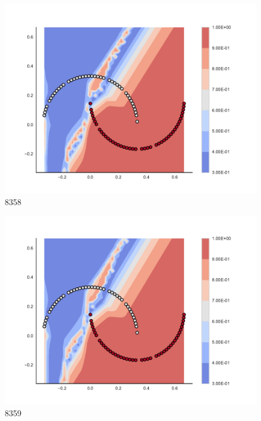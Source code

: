 \begin{subfigure}[b]{0.09\textwidth}
    \includegraphics[clip, trim=2.35cm 1.75cm 4.5cm 0cm,width=\textwidth]{img/convergence/8358.pdf}
    \caption{8358}
    \label{fig:convergence_8358}
\end{subfigure}
%
\begin{subfigure}[b]{0.09\textwidth}
    \includegraphics[clip, trim=2.35cm 1.75cm 4.5cm 0cm,width=\textwidth]{img/convergence/8359.pdf}
    \caption{8359}
    \label{fig:convergence_8359}
\end{subfigure}
%
